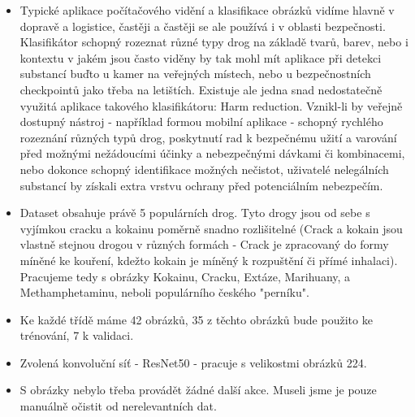 \documentclass[a4paper]{article}
\newenvironment{ukol}[2][]{\begin{trivlist} 
\item[\hskip \labelsep {\bfseries #1}\hskip \labelsep {\bfseries #2}]}{\end{trivlist}}
\begin{document}
\begin{ukol}{Dataset}
\begin{itemize}
	\item Typické aplikace počítačového vidění a klasifikace obrázků vidíme hlavně v dopravě a logistice, častěji a častěji se ale používá i v oblasti bezpečnosti. Klasifikátor schopný rozeznat různé typy drog na základě tvarů, barev, nebo i kontextu v jakém jsou často viděny by tak mohl mít aplikace při detekci substancí buďto u kamer na veřejných místech, nebo u bezpečnostních checkpointů jako třeba na letištích. Existuje ale jedna snad nedostatečně využitá aplikace takového klasifikátoru: Harm reduction. Vznikl-li by veřejně dostupný nástroj - například formou mobilní aplikace - schopný rychlého rozeznání různých typů drog, poskytnutí rad k bezpečnému užití a varování před možnými nežádoucími účinky a nebezpečnými dávkami či kombinacemi, nebo dokonce schopný identifikace možných nečistot, uživatelé nelegálních substancí by získali extra vrstvu ochrany před potenciálním nebezpečím.
	\item Dataset obsahuje právě 5 populárních drog. Tyto drogy jsou od sebe s vyjímkou cracku a kokainu poměrně snadno rozlišitelné (Crack a kokain jsou vlastně stejnou drogou v různých formách - Crack je zpracovaný do formy míněné ke kouření, kdežto kokain je míněný k rozpuštění či přímé inhalaci). Pracujeme tedy s obrázky Kokainu, Cracku, Extáze, Marihuany, a Methamphetaminu, neboli populárního českého "perníku".
	\item Ke každé třídě máme 42 obrázků, 35 z těchto obrázků bude použito ke trénování, 7 k validaci.
	\item Zvolená konvoluční síť - ResNet50 - pracuje s velikostmi obrázků 224.
	\item S obrázky nebylo třeba provádět žádné další akce. Museli jsme je pouze manuálně očistit od nerelevantních dat.
\end{itemize}

\end{ukol}
\end{document}
